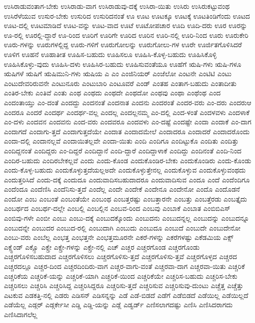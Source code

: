 {ಉಸಿರಾಡುವಂತಾಗ-ಬೇಕು
ಉಸಿರಾಡು-ವಾಗ
ಉಸಿರಾಡುವು-ದಕ್ಕೆ
ಉಸಿರಾ-ಯಿತು
ಉಸಿರು
ಉಸಿರುಕಟ್ಟುವಂಥ
ಉಸಿರೆಳೆಯುವ
ಉಸುರ-ಬೇಕು
ಉಸುರಿದ
ಉಸುರಿದನಂತೆ
ಊ
ಊಟ
ಊಟಕ್ಕೂ
ಊಟಕ್ಕೆ
ಊಟತಿಂಡಿಗೆಂದು
ಊಟದ
ಊಟ-ದಲ್ಲಿ
ಊಟಮಾಡಿದೆ
ಊಟ-ವನ್ನು
ಊಟ-ವಾದ
ಊಟೆ
ಊಟೋಪಚಾರ
ಊದಿ
ಊದಿ-ದರು
ಊರ
ಊರನ್ನು
ಊ-ರಲ್ಲಿ
ಊರಲ್ಲಿ-ದ್ದಾರೆ
ಊ-ರಿಂದ
ಊರಿಗೆ
ಊರಿಗೇ
ಊರಿದ
ಊರಿನ
ಊರಿ-ನಲ್ಲಿ
ಊರಿ-ನಿಂದ
ಊರು
ಊರುಕೇರಿ
ಊರು-ಗಳನ್ನು
ಊರುಗಳಲ್ಲಿದ್ದ
ಊರು-ಗಳಿಗೆ
ಊರುಗೋಲನ್ನು
ಊರುಗೋಲು-ಗಳ
ಊರೇ
ಊರ್ಜಿತಗೊಳಿಸಿದರೆ
ಊಳಿಗ
ಊಹನೆ
ಊಹಾತೀತ
ಊಹಿಸ-ಬಹುದು
ಊಹಿಸಲೂ
ಊಹಿಸಿ-ಕೊಳ್ಳ-ಬಹುದು
ಊಹಿಸಿಕೊಳ್ಳಿ
ಊಹಿಸಿಕೊಳ್ಳು-ವುದು
ಊಹಿಸಿ-ದಳು
ಊಹಿಸಿರ-ಬಹುದು
ಊಹಿಸುವಂತೆಯೂ
ಊಹೆಗೆ
ಋಷಿ-ಗಳು
ಋಷಿ-ಗಳೂ
ಋಷಿಗಳೆ
ಋಷಿಗೆ
ಋಷಿಮುನಿ-ಗಳು
ಋಷಿಯ
ಎ
ಎಂ
ಎಂಜಿನಿಯರ್
ಎಂಜೆಲೋ
ಎಂಟನೇ
ಎಂಟಿಟಿ
ಎಂಟು
ಎಂಟುದೇವರಿರುವನೇ
ಎಂಟುನೂರು
ಎಂಟುಬಾರಿ
ಎಂಟೂವರೆ
ಎಂಡ್
ಎಂತಹ
ಎಂತಾಗ-ಬಹುದು
ಎಂತಾದೀತು
ಎಂತಿರ-ಬೇಕು
ಎಂತಿವೆ
ಎಂತು
ಎಂಥ
ಎಂಥದು
ಎಂಥದೇ
ಎಂಥದೋ
ಎಂಥವು
ಎಂಥಾ
ಎಂಥೆಂಥ
ಎಂದ
ಎಂದಂತಾಯ್ತು
ಎಂ-ದಂತೆ
ಎಂದದ್ದು
ಎಂದನಂತೆ
ಎಂದನಾತ
ಎಂದನು
ಎಂದರಂತೆ
ಎಂದರ-ವರು
ಎಂ-ದರು
ಎಂದರುಆ
ಎಂದರೂ
ಎಂದರೆ
ಎಂದರ್ಥ
ಎಂದರ್ಥ-ವಲ್ಲ
ಎಂದಲ್ಲ
ಎಂದಲ್ಲನಮ್ಮ
ಎಂ-ದಲ್ಲಿ
ಎಂದ-ಳಂತೆ
ಎಂದಳವಳು
ಎಂದಳಾಕೆ
ಎಂ-ದಳು
ಎಂದವನ
ಎಂದವನು
ಎಂದ-ವರು
ಎಂದವರೂ
ಎಂದವಳು
ಎಂ-ದಷ್ಟೆ
ಎಂದಷ್ಟೇ
ಎಂದಾ
ಎಂದಾಕೆ
ಎಂ-ದಾಗ
ಎಂದಾಗದೆ
ಎಂದಾಗು-ತ್ತದೆ
ಎಂದಾಗುತ್ತದೆಯೇ
ಎಂದಾತ
ಎಂದಾದಮೇಲೆ
ಎಂದಾದರೂ
ಎಂದಾದರೆ
ಎಂದಾದರೊಂದು
ಎಂದಾ-ದಲ್ಲಿ
ಎಂದಾನಲ್ಲವೆ
ಎಂದಾಯಿತಲ್ಲವೇ
ಎಂದಾ-ಯಿತು
ಎಂದಿ
ಎಂದಿಗೂ
ಎಂದಿಟ್ಟುಕೊ
ಎಂದಿತು
ಎಂದಿತ್ತು
ಎಂದಿದ್ದನಂತೆ
ಎಂದಿದ್ದರು
ಎಂ-ದಿದ್ದರೆ
ಎಂದಿದ್ದಾನೆ
ಎಂದಿ-ದ್ದಾರೆ
ಎಂದಿದ್ದಾಳಾಕೆ
ಎಂದಿದ್ದು
ಎಂದಿನಂತೆ
ಎಂದಿ-ನಿಂದ
ಎಂದಿರ-ಬಹುದು
ಎಂದಿರಬೇಕಲ್ಲವೆ
ಎಂದು
ಎಂದು-ಕೊಂಡ
ಎಂದುಕೊಂಡಿರ-ಬೇಕು
ಎಂದುಕೊಂಡಿರು
ಎಂದು-ಕೊಂಡು
ಎಂದು-ಕೊಳ್ಳ-ಬಹುದು
ಎಂದುಕೊಳ್ಳುತ್ತದೆಯಲ್ಲಅದೇ
ಎಂದುಕೊಳ್ಳುತ್ತೇನಲ್ಲ
ಎಂದುಕೊಳ್ಳುವ
ಎಂದುಕೊಳ್ಳುವಂಥದು
ಎಂದುತ್ತರಿಸಿದೆ
ಎಂದು-ದಕ್ಕೆ
ಎಂದುದೂ
ಎಂದುವಾದಿಸಬಹುದಾದರೂ
ಎಂದುವಾದಿಸುವ
ಎಂದೂ
ಎಂದೆ
ಎಂದೆಂದಿಗೂ
ಎಂದೆಂದೂ
ಎಂದೆಣಿಸಿ
ಎಂದೆನಿಸು-ತ್ತದೆ
ಎಂದೆಲ್ಲ
ಎಂದೇ
ಎಂದೇಕೆ
ಎಂದೇನೂ
ಎಂದೇನೋ
ಎಂದೊ
ಎಂದೊಡನೆ
ಎಂದೋ
ಎಂಬ
ಎಂಬಂತೆ
ಎಂಬಂತೆಯೇ
ಎಂಬಂಥ
ಎಂಬತ್ತರಷ್ಟು
ಎಂಬತ್ತಾರನೇ
ಎಂಬತ್ತು
ಎಂಬತ್ತೆರಡು
ಎಂಬತ್ತೈದು
ಎಂಬರ್ಥದ
ಎಂಬರ್ಥ-ದಲ್ಲೇ
ಎಂಬಲ್ಲಿ
ಎಂಬಲ್ಲಿನ
ಎಂಬವ-ರಿಂದ
ಎಂಬವು
ಎಂಬಾಕೆ
ಎಂಬಾತ
ಎಂಬಿಬಿಎಸ್
ಎಂಬಿವು-ಗಳೇ
ಎಂಬೀ
ಎಂಬು
ಎಂಬು-ದಕ್ಕೆ
ಎಂಬುದಕ್ಕೊಂದು
ಎಂಬುದನು
ಎಂಬುದನ್ನಲ್ಲ
ಎಂಬುದನ್ನು
ಎಂಬುದನ್ನೂ
ಎಂಬುದನ್ನೇ
ಎಂಬುದರ
ಎಂಬುದ-ರಲ್ಲಿ
ಎಂಬುದಾಗಿ
ಎಂಬುದು
ಎಂಬುದೂ
ಎಂಬುದೆ
ಎಂಬುದೇ
ಎಂಬುದೇನೋ
ಎಂಬು-ವರು
ಎಂಬೆಲ್ಲ
ಎಂಭತ್ತ
ಎಂಭತ್ತನೇ
ಎಂಭತ್ತಮೂರನೇ
ಎಕರೆ-ಗಳನ್ನು
ಎಕರೆಗಳಷ್ಟು
ಎಕೆಡಮಿಯ
ಎಕ್ಸ್
ಎಕ್ಸ್ಟೆಂಡ್
ಎಕ್ಸ್ಪೊ
ಎಕ್ಸ್ರೇ
ಎಕ್ಸ್ರೇ-ಗಳನ್ನು
ಎಕ್ಸ್ರೇ-ನಲ್ಲಿ
ಎಚ್
ಎಚ್ಚರ
ಎಚ್ಚರಗೊಂಡ
ಎಚ್ಚರಗೊಂಡು
ಎಚ್ಚರಗೊಳಿಸಬಹುದಾದ
ಎಚ್ಚರಗೊಳಿಸಲು
ಎಚ್ಚರಗೊಳಿಸು-ತ್ತದೆ
ಎಚ್ಚರಗೊಳಿಸು-ತ್ತವೆ
ಎಚ್ಚರಗೊಳ್ಳದ
ಎಚ್ಚರದ
ಎಚ್ಚರದಲ್ಲೂ
ಎಚ್ಚರ-ದಿಂದ
ಎಚ್ಚರದಿಂದಿರು-ವಾಗ
ಎಚ್ಚರ-ವಾಗು-ವಂತೆ
ಎಚ್ಚರವಾ-ದಾಗ
ಎಚ್ಚರವಾ-ಯಿತು
ಎಚ್ಚರಿಕೆ
ಎಚ್ಚರಿಕೆಯ
ಎಚ್ಚರಿಕೆ-ಯನ್ನು
ಎಚ್ಚರಿಕೆ-ಯಾಗಿ
ಎಚ್ಚರಿಕೆ-ಯಿಂದ
ಎಚ್ಚರಿಕೆಯೇ
ಎಚ್ಚರಿಸ-ಬಹುದು
ಎಚ್ಚರಿಸ-ಬೇಕು
ಎಚ್ಚರಿಸಲು
ಎಚ್ಚರಿಸಿ
ಎಚ್ಚರಿಸಿದ್ದ
ಎಚ್ಚರಿಸಿದ್ದರೂ
ಎಚ್ಚರಿಸು-ತ್ತದೆ
ಎಚ್ಚರಿಸುವ
ಎಚ್ಚರಿಸುವು-ದುಂಟು
ಎಚ್ಚೆತ್ತ
ಎಚ್ಚೆತ್ತು
ಎಟಕುವ
ಎಡಕತ್ತಿ-ನಲ್ಲಿ
ಎಡರು
ಎಡಿಸನ್
ಎಡಿಸನ್ನನ್ನು
ಎಡೆ
ಎಡೆ-ಬಿಡದೆ
ಎಡೆಗೆ
ಎಡೆಬಿಡದೆ
ಎಡೆಯಿಲ್ಲ
ಎಡೆಯಿಲ್ಲದೆ
ಎಡೆಯೆಲ್ಲ
ಎಡ್ಗರ್
ಎಡ್ಗರ್ಕೇಸೀ
ಎಡ್ಡಿ
ಎಡ್ಡಿ-ಯನ್ನು
ಎಡ್ಲೆ
ಎಡ್ವರ್ಡ್
ಎಣಿಸಲಾಗದಷ್ಟು
ಎಣಿಸಿ
ಎಣಿಸಿದರಾಗದು
ಎಣಿಸಿದಾಗಲೆಲ್ಲ
}
